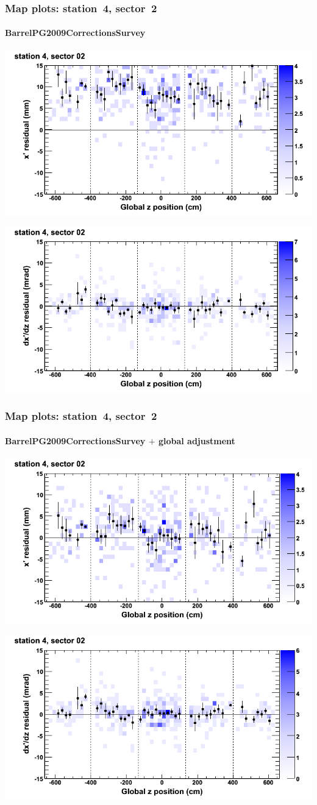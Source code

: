 \documentclass[compress]{beamer}
\begin{document}
\begin{frame}
\frametitle{Map plots: station~4, sector~2}
\framesubtitle{BarrelPG2009CorrectionsSurvey}
\includegraphics[width=0.5\linewidth]{mapplots_01/DTvsz_st4sec02_x.png}

\includegraphics[width=0.5\linewidth]{mapplots_01/DTvsz_st4sec02_dxdz.png}
\end{frame}
\begin{frame}
\frametitle{Map plots: station~4, sector~2}
\framesubtitle{BarrelPG2009CorrectionsSurvey $+$ global adjustment}
\includegraphics[width=0.5\linewidth]{mapplots_re01/DTvsz_st4sec02_x.png}

\includegraphics[width=0.5\linewidth]{mapplots_re01/DTvsz_st4sec02_dxdz.png}
\end{frame}
\end{document}
